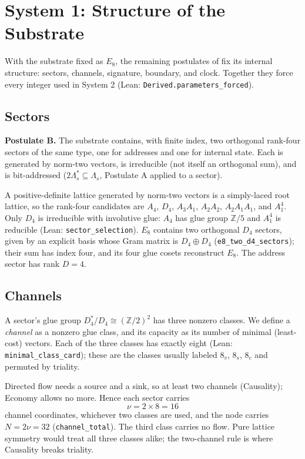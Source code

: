 \section{System 1: Structure of the Substrate}
\label{sec:system1_projection}
With the substrate fixed as $E_8$, the remaining postulates of  fix its internal structure: sectors, channels, signature, boundary, and clock. Together they force every integer used in System 2 (Lean: \texttt{Derived.parameters\_forced}).

\subsection{Sectors}
\label{sec:symmetric_decomposition}
\textbf{Postulate B.} The substrate contains, with finite index, two orthogonal rank-four sectors of the same type, one for addresses and one for internal state. Each is generated by norm-two vectors, is irreducible (not itself an orthogonal sum), and is bit-addressed ($2\Lambda_s^*\subseteq\Lambda_s$, Postulate A applied to a sector).

A positive-definite lattice generated by norm-two vectors is a simply-laced root lattice, so the rank-four candidates are $A_4$, $D_4$, $A_3A_1$, $A_2A_2$, $A_2A_1A_1$, and $A_1^4$. Only $D_4$ is irreducible with involutive glue: $A_4$ has glue group $\mathbb Z/5$ and $A_1^4$ is reducible (Lean: \texttt{sector\_selection}). $E_8$ contains two orthogonal $D_4$ sectors, given by an explicit basis whose Gram matrix is $D_4\oplus D_4$ (\texttt{e8\_two\_d4\_sectors}); their sum has index four, and its four glue cosets reconstruct $E_8$. The address sector has rank $D=4$.

\subsection{Channels}
\label{sec:chiralcapacity}
A sector's glue group $D_4^*/D_4\cong(\mathbb Z/2)^2$ has three nonzero classes. We define a \emph{channel} as a nonzero glue class, and its capacity as its number of minimal (least-cost) vectors. Each of the three classes has exactly eight (Lean: \texttt{minimal\_class\_card}); these are the classes usually labeled $8_v$, $8_s$, $8_c$ and permuted by triality\cite{slansky_group_1981}.

Directed flow needs a source and a sink, so at least two channels (Causality); Economy allows no more. Hence each sector carries
\begin{equation}
\nu=2\times8=16
\end{equation}
channel coordinates, whichever two classes are used, and the node carries $N=2\nu=32$ (\texttt{channel\_total}). The third class carries no flow. Pure lattice symmetry would treat all three classes alike; the two-channel rule is where Causality breaks triality.

